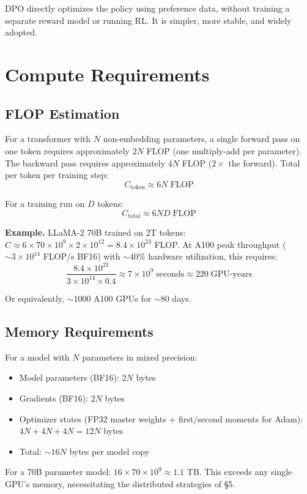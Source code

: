 \documentclass[main.tex]{subfiles}
\begin{document}
DPO directly optimizes the policy using preference data, without training a separate reward model or running RL. It is simpler, more stable, and widely adopted.

\needspace{0.33\textheight}
\section{Compute Requirements}

\subsection{FLOP Estimation}

For a transformer with $N$ non-embedding parameters, a single forward pass on one token requires approximately $2N$ FLOP (one multiply-add per parameter). The backward pass requires approximately $4N$ FLOP ($2\times$ the forward). Total per token per training step:
$$C_{\text{token}} \approx 6N \;\text{FLOP}$$

For a training run on $D$ tokens:
$$C_{\text{total}} \approx 6ND \;\text{FLOP}$$

\textbf{Example.} LLaMA-2 70B trained on 2T tokens: $C \approx 6 \times 70 \times 10^9 \times 2 \times 10^{12} = 8.4 \times 10^{23}$ FLOP. At A100 peak throughput ($\sim 3 \times 10^{14}$ FLOP/s BF16) with $\sim 40\%$ hardware utilization, this requires:
$$\frac{8.4 \times 10^{23}}{3 \times 10^{14} \times 0.4} \approx 7 \times 10^{9}\;\text{seconds} \approx 220\;\text{GPU-years}$$

Or equivalently, $\sim\!1000$ A100 GPUs for $\sim\!80$ days.

\subsection{Memory Requirements}

For a model with $N$ parameters in mixed precision:
\begin{itemize}
    \item Model parameters (BF16): $2N$ bytes
    \item Gradients (BF16): $2N$ bytes
    \item Optimizer states (FP32 master weights + first/second moments for Adam): $4N + 4N + 4N = 12N$ bytes
    \item Total: $\sim\!16N$ bytes per model copy
\end{itemize}

For a 70B parameter model: $16 \times 70 \times 10^9 \approx 1.1$ TB. This exceeds any single GPU's memory, necessitating the distributed strategies of \S5.
\end{document}
